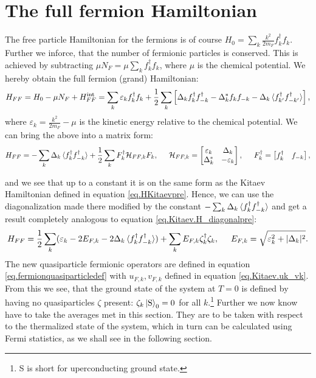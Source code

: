 \section{The full fermion Hamiltonian} \label{sec.HFFfull}
The free particle Hamiltonian for the fermions is of course $H_0 = \sum_k \frac{k^2}{2m_F} f^\dagger_k f_k$. Further we inforce, that the number of fermionic particles is conserved. This is achieved by subtracting $\mu N_F = \mu \sum_k f^\dagger_k f_k$, where $\mu$ is the chemical potential. We hereby obtain the full fermion (grand) Hamiltonian:
\begin{equation}
H_{FF} = H_0-\mu N_F + H^\text{int}_{FF} = \sum_k \varepsilon_k f^\dagger_k f_k + \frac{1}{2}\sum_{k} \left[ \Delta_k f^\dagger_k f^\dagger_{-k} - \Delta^*_k f_k f_{-k} - \Delta_k \braket {f^\dagger_{k'}f^\dagger_{-k'}} \right], 
\label{eq.HFFdef}
\end{equation} 
where $\varepsilon_k = \frac{k^2}{2m_F}-\mu$ is the kinetic energy relative to the chemical potential. We can bring the above into a matrix form:
\begin{equation}
H_{FF} = -\sum_k \Delta_k \braket {f^\dagger_k f^\dagger_{-k}} + \frac{1}{2}\sum_{k} F_k^\dagger \mathcal{H}_{FF,k} F_k, \hspace{0.5cm} \mathcal{H}_{FF,k} = \begin{bmatrix} \varepsilon_k & \Delta_k \\ \Delta^*_k & -\varepsilon_k \end{bmatrix}, \hspace{0.5cm} F^\dagger_k = \begin{bmatrix} f_k^\dagger & f_{-k} \end{bmatrix}, 
\end{equation}

and we see that up to a constant it is on the same form as the Kitaev Hamiltonian defined in equation \eqref{eq.HKitaevpre}. Hence, we can use the diagonalization made there modified by the constant $-\sum_k \Delta_k\braket {f^\dagger_k f^\dagger_{-k}} $ and get a result completely analogous to equation \eqref{eq.Kitaev.H_diagonalpre}: 
\begin{equation}
H_{FF} = \frac{1}{2}\sum_k (\varepsilon_k-2E_{F,k}-2\Delta_k\braket {f^\dagger_k f^\dagger_{-k}}) + \sum_k E_{F,k} \zeta^\dagger_k \zeta_k, \hspace{0.5cm} E_{F,k} = \sqrt{\varepsilon_k^2 + |\Delta_k|^2}.
\label{eq.Kitaev.HFF_diagonal}
\end{equation}
The new quasiparticle fermionic operators are defined in equation \eqref{eq.fermionquasiparticledef} with $u_{F,k},v_{F,k}$ defined in equation \eqref{eq.Kitaev.uk_vk}. From this we see, that the ground state of the system at $T=0$ is defined by having no quasiparticles $\zeta$ present: $\zeta_k \ket{\text{S}}_0 = 0$ for all $k$.\footnote{S is short for uperconducting ground state.} Further we now know have to take the averages met in this section. They are to be taken with respect to the thermalized state of the system, which in turn can be calculated using Fermi statistics, as we shall see in the following section. 

